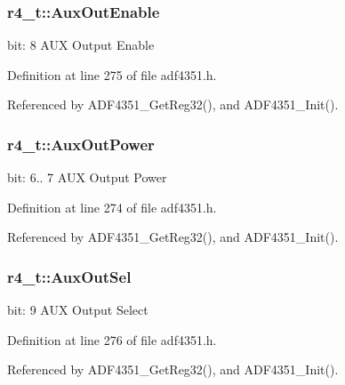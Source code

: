 \subsubsection[{\texorpdfstring{Aux\+Out\+Enable}{AuxOutEnable}}]{ r4\+\_\+t\+::\+Aux\+Out\+Enable}\hypertarget{structr4__t_ab6c43ed3da1189c3de8cf2cafafb03f3}{}\label{structr4__t_ab6c43ed3da1189c3de8cf2cafafb03f3}
bit\+: 8 A\+UX Output Enable 

Definition at line 275 of file adf4351.\+h.



Referenced by A\+D\+F4351\+\_\+\+Get\+Reg32(), and A\+D\+F4351\+\_\+\+Init().

\subsubsection[{\texorpdfstring{Aux\+Out\+Power}{AuxOutPower}}]{ r4\+\_\+t\+::\+Aux\+Out\+Power}\hypertarget{structr4__t_a92b00824868c7911a73217cbdd48ca96}{}\label{structr4__t_a92b00824868c7911a73217cbdd48ca96}
bit\+: 6.. 7 A\+UX Output Power 

Definition at line 274 of file adf4351.\+h.



Referenced by A\+D\+F4351\+\_\+\+Get\+Reg32(), and A\+D\+F4351\+\_\+\+Init().

\subsubsection[{\texorpdfstring{Aux\+Out\+Sel}{AuxOutSel}}]{ r4\+\_\+t\+::\+Aux\+Out\+Sel}\hypertarget{structr4__t_af75cec4d15f4f2e086db3be6d4c3c215}{}\label{structr4__t_af75cec4d15f4f2e086db3be6d4c3c215}
bit\+: 9 A\+UX Output Select 

Definition at line 276 of file adf4351.\+h.



Referenced by A\+D\+F4351\+\_\+\+Get\+Reg32(), and A\+D\+F4351\+\_\+\+Init().

